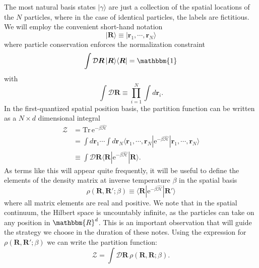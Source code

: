 \documentclass[prb,10pt,aps,floatfix,notitlepage]{revtex4-1}
\renewcommand{\vec}[1]{\boldsymbol{#1}}
\newcommand{\e}[1]{\mathrm{e}^{#1}}
\newcommand{\R}{\vec{R}}
\begin{document}
The most natural basis states $|\gamma\rangle$ are just a
collection of the spatial locations of the $N$ particles, where in the case of
identical particles, the labels are fictitious. We will employ the convenient
short-hand notation 
%
\begin{equation}
    |\R\rangle \equiv |\vec{r}_1, \cdots, \vec{r}_N \rangle
\end{equation}
%
where particle conservation enforces the normalization constraint
%
\begin{equation}
\int \mathcal{D}\R\, |\R\rangle \langle \R | = \mathbbm{1}
\label{eq:Norm}
\end{equation}
%
with 
%
\begin{equation}
    \int\mathcal{D} \R  \equiv \prod_{i=1}^N \int d \vec{r}_i.
\end{equation}
%
In the first-quantized spatial position basis, the partition function can be
written as a $N \times d$ dimensional integral
%
\begin{align}
    \mathcal{Z} &= \mathrm{Tr}\, \e{-\beta \hat{\mathcal{H}}}  \nonumber \\
                &= \int d\vec{r}_1 \cdots \int d\vec{r}_N \langle \vec{r}_1,
    \cdots, \vec{r}_N | \e{-\beta \hat{\mathcal{H}}}| \vec{r}_1, \cdots,
    \vec{r}_N \rangle \nonumber \\
&\equiv \int \mathcal{D} \R \langle \R | \e{-\beta \hat{\mathcal{H}}} | \R
    \rangle.
\label{eq:ZDR}
\end{align}
%
As terms like this will appear quite frequently, it will be useful to define
the elements of the density matrix at inverse temperature $\beta$ in the
spatial basis
%
\begin{equation}
    \rho(\R, \R'; \beta) \equiv \langle \R | \e{-\beta \hat{\mathcal{H}}} |
    \R'\rangle
\end{equation}
%
where all matrix elements are real and positive. We note that in the spatial
continuum, the Hilbert space is uncountably infinite, as the particles can take
on any position in $\mathbbm{R}^d$. This is an important observation that will
guide the strategy we choose in the duration of these notes. Using the
expression for $\rho(\R,\R';\beta)$ we can write the partition function:
%
\begin{equation}
\mathcal{Z} = \int \mathcal{D}\R \, \rho(\R,\R;\beta).
\label{eq:Zrho}
\end{equation}
%
\end{document}
